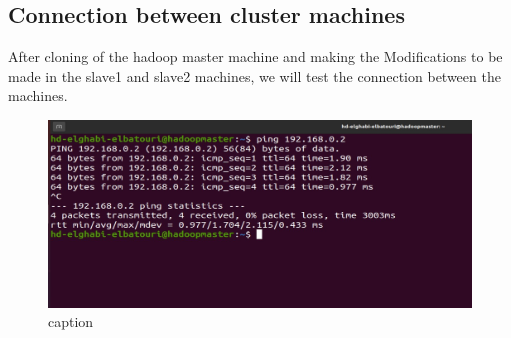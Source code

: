 \begin{spacing}{1.2}
\section{Connection between cluster machines}

\par After cloning of the hadoop master machine and making the Modifications to be made in the slave1 and slave2 machines, we will test the connection between the machines.
\\
\begin{figure}[!htb] 
\begin{center} 
\includegraphics[width=1\linewidth]{Big_Data/Hadoop/Multi-Nodes Cluster/Master ping to Slave1.jpg} 
\end{center} 
\caption{caption} 
\end{figure} 
\FloatBarrier


\end{spacing}
